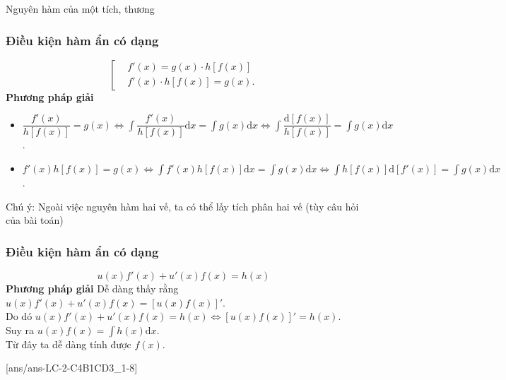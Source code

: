 \begin{dang}{Nguyên hàm của một tích, thương}
	\subsubsection{Điều kiện hàm ẩn có dạng}
	$$\left[ \begin{aligned}
			 & f'(x)=g(x)\cdot h\left[ f(x) \right]  \\
			 & f'(x)\cdot h\left[ f(x) \right]=g(x).
		\end{aligned} \right.$$
	\textbf{Phương pháp giải}
	\begin{itemize}%
		\item $\dfrac{f'(x)}{h[f(x)]}=g(x) \Leftrightarrow \displaystyle\int \dfrac{f'(x)}{h[f(x)]}\mathrm{d}x =\int  {g(x)}\mathrm{d}x \Leftrightarrow \int\dfrac{\mathrm{d}\left[ f(x) \right]}{h\left[ f(x) \right]} =\int  {g(x)\mathrm{d}x}$.
		\item $f'(x)h[f(x)]=g(x)
			      \Leftrightarrow
			      \displaystyle\int f'(x)h[f(x)]\mathrm{d}x=\int g(x)\mathrm{d}x
			      \Leftrightarrow
			      \int h[f(x)]\mathrm{d}\left[ f'(x) \right]=\int g(x)\mathrm{d}x$.
	\end{itemize}
	Chú ý: Ngoài việc nguyên hàm hai vế, ta có thể lấy tích phân hai vế (tùy câu hỏi của bài toán)
	\subsubsection{Điều kiện hàm ẩn có dạng}
	$$u(x)f'(x)+u'(x)f(x)=h(x)$$
	\textbf{Phương pháp giải}
	Dễ dàng thấy rằng $u(x)f'(x)+u'(x)f(x)=[u(x)f(x)]'$.\\
	Do dó $u(x)f'(x)+u'(x)f(x)=h(x) \Leftrightarrow [u(x)f(x)]'=h(x)$.\\
	Suy ra $u(x)f(x)=\displaystyle\int   h(x)\mathrm{d}x$.\\
	Từ đây ta dễ dàng tính được $f(x)$.
\end{dang}

{}[ans/ans-LC-2-C4B1CD3_1-8]

